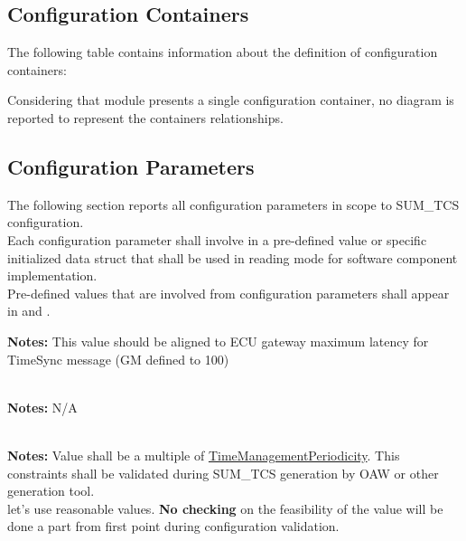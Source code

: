 \subsection{Configuration Containers}
\label{subsec:ConfigurationContainers}

The following table contains information about the definition of configuration containers:



Considering that module presents a single configuration container, no diagram is reported to represent the containers relationships.

\subsection{Configuration Parameters}

The following section reports all configuration parameters in scope to SUM\_TCS configuration. 
\\
Each configuration parameter shall involve in a pre-defined value or specific initialized data struct
that shall be used in reading mode for software component implementation.
\\
Pre-defined values that are involved from configuration parameters shall appear in  and .

\label{conf:MasterClockPollingPeriodicity}
\newline
{\textbf{Notes:} This value should be aligned to ECU gateway maximum latency for TimeSync message (GM defined to 100)}
\newline

\\
\label{conf:PermitExecutionMask}
\newline
{\textbf{Notes:} N/A}
\\
{}
\newline

\label{conf:SumTCSGlobalTimePrecision}

\\
{\textbf{Notes:} Value shall be a multiple of \hyperref[conf:TimeManagementPeriodicity]{TimeManagementPeriodicity}. This constraints shall be validated during SUM\_TCS generation by OAW or other generation tool.\\
 let's use reasonable values. \textbf{No checking} on the feasibility of the value will be done a part from first point during configuration validation.}
 \\
{}

